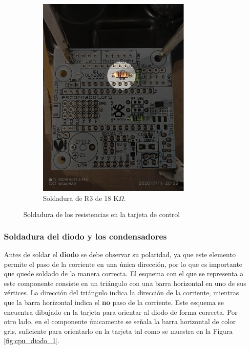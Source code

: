 \documentclass{article}
\begin{document}
\begin{figure}[H]
\begin{subfigure}[t]{0.3\textwidth}
        \includegraphics[width=0.9\columnwidth, height=1.2\columnwidth]{images/CPU/cpu_resistencias_2.jpg}
        \caption{Soldadura de R3 de 18 K$\Omega$.}
        \label{fig:cpu_resistencias_2}
    \end{subfigure}
    \caption{Soldadura de los resistencias en la tarjeta de control}
    \label{fig:cpu_resistencias}
\end{figure}

\subsubsection{Soldadura del diodo y los condensadores}
Antes de soldar el \textbf{diodo} se debe observar su polaridad, ya que este elemento permite el paso de la corriente en una única dirección, por lo que es importante que quede soldado de la manera correcta. El esquema con el que se representa a este componente consiste en un triángulo con una barra horizontal en uno de sus vértices. La dirección del triángulo indica la dirección de la corriente, mientras que la barra horizontal indica el \textbf{no} paso de la corriente. Este esquema se encuentra dibujado en la tarjeta para orientar al diodo de forma correcta. Por otro lado, en el componente únicamente se señala la barra horizontal de color gris, suficiente para orientarlo en la tarjeta tal como se muestra en la Figura \ref{fig:cpu_diodo_1}.
\end{document}
